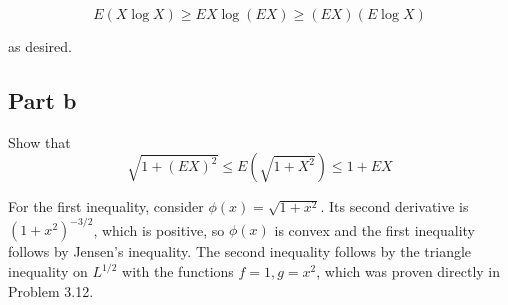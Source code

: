 \documentclass{article}
\begin{document}
\[
E(X \log X) \geq EX \log(EX) \geq (EX)(E\log X)
\]

as desired.

\subsection*{Part b}

Show that 
\[
\sqrt{1 + (EX)^2} \leq E(\sqrt{1+X^2}) \leq 1+EX
\]

For the first inequality, consider $\phi(x) = \sqrt{1+x^2}$. Its second derivative is $(1+x^2)^{-3/2}$, which is positive, so $\phi(x)$ is convex and the first inequality follows by Jensen's inequality. The second inequality follows by the triangle inequality on $L^{1/2}$ with the functions $f=1, g=x^2$, which was proven directly in Problem 3.12.
\end{document}
